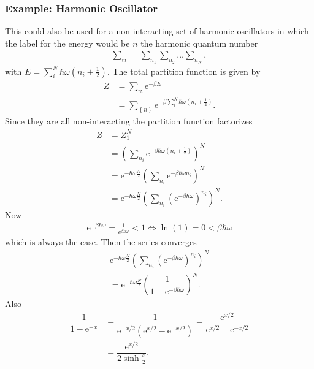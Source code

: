\documentclass[a4paper,10pt]{article}
\numberwithin{equation}{section}
\begin{document}
\begin{multicols}{2}
\subsubsection{Example: Harmonic Oscillator}
This could also be used for a non-interacting set of harmonic oscillators in which the label for the energy would be $n$ the harmonic quantum number
\begin{align} 
  \sum_{\mathfrak{m}}^{}=\sum_{n_1}^{}\sum_{n_2}^{}\hdots \sum_{n_N}^{}
,\end{align} 
with $E=\sum_{i}^{N}\hbar \omega \left(n_i+\tfrac{1}{2}\right)$.
The total partition function is given by
\begin{align} 
  Z &= \sum_{\mathfrak{m}}^{}\text{e}^{-\beta E}\\
    &= \sum_{ \left\{n\right\}}^{}\text{e}^{-\beta \sum_{i}^{N}\hbar \omega (n_i+\tfrac{1}{2})}
.\end{align} 
Since they are all non-interacting the partition function factorizes
\begin{align} 
  Z &= Z_1^N\\
    &= \left(\sum_{n_i}^{}\text{e}^{-\beta \hbar \omega \left(n_i+\tfrac{1}{2}\right)}\right)^N\\
    &= \text{e}^{-\hbar \omega \tfrac{N}{2}}\left(\sum_{n_i}^{}\text{e}^{-\beta \hbar \omega n_i}\right)^N\\
    &= \text{e}^{-\hbar \omega \tfrac{N}{2}}\left(\sum_{n_i}^{}\left(\text{e}^{-\beta \hbar \omega }\right)^{n_i}\right)^N
.\end{align} 
Now 
\begin{align} 
  \text{e}^{-\beta \hbar \omega }=\tfrac{1}{\text{e}^{\beta \hbar \omega }}<1 \Leftrightarrow \ln(1)=0<\beta \hbar \omega 
\end{align} 
which is always the case.
Then the series converges
\begin{multline} 
    \text{e}^{-\hbar \omega \tfrac{N}{2}}\left(\sum_{n_i}^{}\left(\text{e}^{-\beta \hbar \omega }\right)^{n_i}\right)^N \\= \text{e}^{-\hbar \omega \tfrac{N}{2}}\left(\dfrac{1}{1-\text{e}^{-\beta \hbar \omega }}\right)^N
.\end{multline} 
Also
\begin{align} 
  \dfrac{1}{1-\text{e}^{-x}} &= \dfrac{1}{\text{e}^{-x/2}\left(\text{e}^{x/2}-\text{e}^{-x/2}\right)}=\dfrac{\text{e}^{x/2}}{\text{e}^{x/2}-\text{e}^{-x/2}}\\
                             &= \dfrac{\text{e}^{x/2}}{2\sinh \tfrac{x}{2}}
.\end{align} 

\end{multicols}
\end{document}
